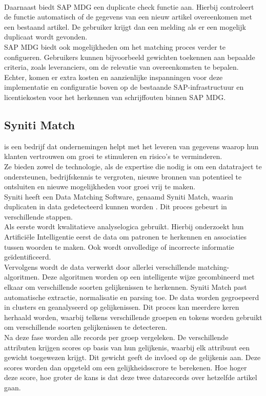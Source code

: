 \\Daarnaast biedt SAP MDG een duplicate check functie aan. Hierbij controleert de functie automatisch of de gegevens van een nieuw artikel overeenkomen met een bestaand artikel. De gebruiker krijgt dan een melding als er een mogelijk duplicaat wordt gevonden. 
\\ SAP MDG biedt ook mogelijkheden om het matching proces verder te configueren. Gebruikers kunnen bijvoorbeeld gewichten toekennen aan bepaalde criteria, zoals leveranciers, om de relevatie van overeenkomsten te bepalen.
\\Echter, komen er extra kosten en aanzienlijke inspanningen voor deze implementatie en configuratie boven op de bestaande SAP-infrastructuur en licentiekosten voor het herkennen van schrijffouten binnen SAP MDG.

\subsection{Syniti Match}
\textcite{SynitiAbout} is een bedrijf dat ondernemingen helpt met het leveren van gegevens waarop hun klanten vertrouwen om groei te stimuleren en risico's te verminderen.
\\Ze bieden zowel de technologie, als de expertise die nodig is om een datatraject te ondersteunen, bedrijfskennis te vergroten, nieuwe bronnen van potentieel te ontsluiten en nieuwe mogelijkheden voor groei vrij te maken.
\\Syniti heeft een Data Matching Software, genaamd Syniti Match, waarin duplicaten in data gedetecteerd kunnen worden \autocite{SynitiMatch}. Dit proces gebeurt in verschillende stappen. 
\\Als eerste wordt kwalitatieve analyselogica gebruikt. Hierbij onderzoekt hun Artificiële Intelligentie eerst de data om patronen te herkennen en associaties tussen woorden te maken. Ook wordt onvolledige of incorrecte informatie geïdentificeerd. 
\\Vervolgens wordt de data verwerkt door allerlei verschillende matching-algoritmen. Deze algoritmen worden op een intelligente wijze gecombineerd met elkaar om verschillende soorten gelijkenissen te herkennen. Syniti Match past automatische extractie, normalisatie en parsing toe. De data worden gegroepeerd in clusters en geanalyseerd op gelijkenissen. Dit proces kan meerdere keren herhaald worden, waarbij telkens verschillende groepen en tokens worden gebruikt om verschillende soorten gelijkenissen te detecteren. 
\\Na deze fase worden alle records per groep vergeleken. De verschillende attributen krijgen scores op basis van hun gelijkenis, waarbij elk attribuut een gewicht toegewezen krijgt. Dit gewicht geeft de invloed op de gelijkenis aan. Deze scores worden dan opgeteld om een gelijkheidsscrore te berekenen. Hoe hoger deze score, hoe groter de kans is dat deze twee datarecords over hetzelfde artikel gaan. 
